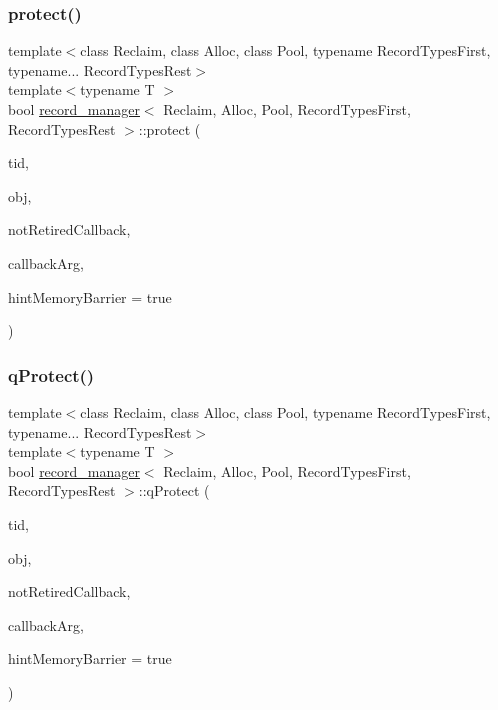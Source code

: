 \subsubsection{\texorpdfstring{protect()}{protect()}}
{\footnotesize\ttfamily template$<$class Reclaim, class Alloc, class Pool, typename Record\+Types\+First, typename... Record\+Types\+Rest$>$ \\
template$<$typename T $>$ \\
bool \hyperlink{classrecord__manager}{record\+\_\+manager}$<$ Reclaim, Alloc, Pool, Record\+Types\+First, Record\+Types\+Rest $>$\+::protect (\begin{DoxyParamCaption}\item[{const int}]{tid,  }\item[{T $\ast$const}]{obj,  }\item[{\hyperlink{globals_8h_a57f5c0d40b156d7d996492fb2f16e3cd}{Callback\+Type}}]{not\+Retired\+Callback,  }\item[{\hyperlink{globals_8h_a3de64ef48066ac6430631c8b81a15345}{Callback\+Arg}}]{callback\+Arg,  }\item[{bool}]{hint\+Memory\+Barrier = {\ttfamily true} }\end{DoxyParamCaption})\hspace{0.3cm}{\ttfamily [inline]}}

\mbox{\label{classrecord__manager_a570af4c6a5febf579416b23a8ee72f61}} 
\subsubsection{\texorpdfstring{q\+Protect()}{qProtect()}}
{\footnotesize\ttfamily template$<$class Reclaim, class Alloc, class Pool, typename Record\+Types\+First, typename... Record\+Types\+Rest$>$ \\
template$<$typename T $>$ \\
bool \hyperlink{classrecord__manager}{record\+\_\+manager}$<$ Reclaim, Alloc, Pool, Record\+Types\+First, Record\+Types\+Rest $>$\+::q\+Protect (\begin{DoxyParamCaption}\item[{const int}]{tid,  }\item[{T $\ast$const}]{obj,  }\item[{\hyperlink{globals_8h_a57f5c0d40b156d7d996492fb2f16e3cd}{Callback\+Type}}]{not\+Retired\+Callback,  }\item[{\hyperlink{globals_8h_a3de64ef48066ac6430631c8b81a15345}{Callback\+Arg}}]{callback\+Arg,  }\item[{bool}]{hint\+Memory\+Barrier = {\ttfamily true} }\end{DoxyParamCaption})\hspace{0.3cm}{\ttfamily [inline]}}

